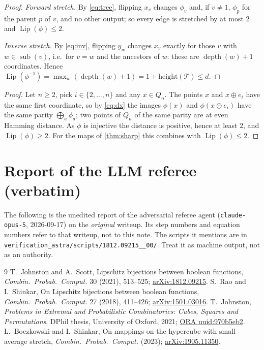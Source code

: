 \documentclass[11pt,a4paper]{article}
\theoremstyle{plain}
\theoremstyle{definition}
\theoremstyle{remark}
\newcommand{\Lip}{\operatorname{Lip}}
\newcommand{\sub}{\operatorname{sub}}
\newcommand{\depth}{\operatorname{depth}}
\begin{document}
\begin{proof}
\emph{Forward stretch.} By \eqref{eq:tree}, flipping $x_v$ changes $\phi_v$ and, if $v\ne1$, $\phi_{p}$ for the parent $p$ of $v$, and no other output; so every edge is stretched by at most $2$ and $\Lip(\phi)\le2$.

\emph{Inverse stretch.} By \eqref{eq:inv}, flipping $y_w$ changes $x_v$ exactly for those $v$ with $w\in\sub(v)$, i.e.\ for $v=w$ and the ancestors of $w$: these are $\depth(w)+1$ coordinates. Hence $\Lip(\phi^{-1})=\max_w(\depth(w)+1)=1+\text{height}(\mathcal T)\le d$.
\end{proof}

\label{pf:C2}
\lemCtwo*
\begin{proof}
Let $n\ge2$, pick $i\in\{2,\dots,n\}$ and any $x\in Q_n$. The points $x$ and $x\oplus e_i$ have the same first coordinate, so by \eqref{eq:dx} the images $\phi(x)$ and $\phi(x\oplus e_i)$ have the same parity $\bigoplus_a\phi_a$; two points of $Q_n$ of the same parity are at even Hamming distance. As $\phi$ is injective the distance is positive, hence at least $2$, and $\Lip(\phi)\ge2$. For the maps of \cref{thm:sharp} this combines with $\Lip(\phi)\le2$.
\end{proof}

\section{Report of the LLM referee (verbatim)}\label{app:referee}

\begin{tcolorbox}[colback=gray!8,colframe=gray!50,boxrule=0.4pt,arc=2pt]
\small The following is the unedited report of the adversarial referee agent (\texttt{claude-opus-5}, 2026-09-17) on the \emph{original} writeup. Its step numbers and equation numbers refer to that writeup, not to this note. The scripts it mentions are in \nolinkurl{verification_astra/scripts/1812.09215__00/}. Treat it as machine output, not as an authority.
\end{tcolorbox}



\begin{thebibliography}{9}
\small
\setlength{\itemsep}{2pt}
 T.~Johnston and A.~Scott, Lipschitz bijections between boolean functions, \emph{Combin.\ Probab.\ Comput.} 30 (2021), 513--525; \href{https://arxiv.org/abs/1812.09215}{arXiv:1812.09215}.
 S.~Rao and I.~Shinkar, On Lipschitz bijections between boolean functions, \emph{Combin.\ Probab.\ Comput.} 27 (2018), 411--426; \href{https://arxiv.org/abs/1501.03016}{arXiv:1501.03016}.
 T.~Johnston, \emph{Problems in Extremal and Probabilistic Combinatorics: Cubes, Squares and Permutations}, DPhil thesis, University of Oxford, 2021; \href{https://ora.ox.ac.uk/objects/uuid:970b5eb2-ad8c-45ba-b0d2-39cac2fffda6}{ORA uuid:970b5eb2}.
 L.~Boczkowski and I.~Shinkar, On mappings on the hypercube with small average stretch, \emph{Combin.\ Probab.\ Comput.} (2023); \href{https://arxiv.org/abs/1905.11350}{arXiv:1905.11350}.
\end{thebibliography}
\end{document}
